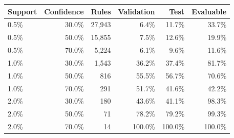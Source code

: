 \begin{tabular}{lrrrrr}
\toprule
Support & Confidence & Rules & Validation & Test & Evaluable \\
\midrule
0.5\% & 30.0\% & 27,943 & 6.4\% & 11.7\% & 33.7\% \\
0.5\% & 50.0\% & 15,855 & 7.5\% & 12.6\% & 19.9\% \\
0.5\% & 70.0\% & 5,224 & 6.1\% & 9.6\% & 11.6\% \\
1.0\% & 30.0\% & 1,543 & 36.2\% & 37.4\% & 81.7\% \\
1.0\% & 50.0\% & 816 & 55.5\% & 56.7\% & 70.6\% \\
1.0\% & 70.0\% & 291 & 51.7\% & 41.6\% & 42.2\% \\
2.0\% & 30.0\% & 180 & 43.6\% & 41.1\% & 98.3\% \\
2.0\% & 50.0\% & 71 & 78.2\% & 79.2\% & 99.3\% \\
2.0\% & 70.0\% & 14 & 100.0\% & 100.0\% & 100.0\% \\
\bottomrule
\end{tabular}
